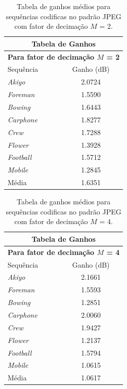 \begin{table}[hbt]
\centering
\caption{Tabela de ganhos médios para sequências codificas no padrão JPEG com fator de decimação $M$ = 2.}
\label{GanhoJpeg2}
\begin{tabular}{l|c}
\hline
\multicolumn{2}{c}{\textbf{Tabela de Ganhos}}\\
\hline
\hline
\multicolumn{2}{c}{\textbf{Para fator de decimação $M$ = 2}}\\
\hline
\hline			
Sequência	    & Ganho (dB)\\
\hline
\hline
\textit{Akiyo}		&2.0724\\
\hline
\textit{Foreman}		&1.5590\\
\hline
\textit{Bowing}		&1.6443\\
\hline
\textit{Carphone}		&1.8277\\
\hline
\textit{Crew}		&1.7288\\
\hline
\textit{Flower}		&1.3928\\
\hline
\textit{Football}		&1.5712\\
\hline
\textit{Mobile}	&1.2845\\
\hline
\hline
Média		&1.6351\\
\hline
\end{tabular}

\end{table}

\begin{table}[hbt]
\centering
\caption{Tabela de ganhos médios para sequências codificas no padrão JPEG com fator de decimação $M$ = 4.}	
\label{GanhoJpeg4}
\begin{tabular}{l|c}
\hline
\multicolumn{2}{c}{\textbf{Tabela de Ganhos}}\\
\hline
\hline
\multicolumn{2}{c}{\textbf{Para fator de decimação $M$ = 4}}\\
\hline
\hline			
Sequência	    & Ganho (dB)\\
\hline
\hline
\textit{Akiyo}		&2.1661\\
\hline
\textit{Foreman}		&1.5593 \\
\hline
\textit{Bowing}		&1.2851\\
\hline
\textit{Carphone}	& 2.0060\\
\hline
\textit{Crew}		& 1.9427\\
\hline
\textit{Flower}		&1.2137\\
\hline
\textit{Football}		&1.5794\\
\hline
\textit{Mobile}	&1.0615\\
\hline
\hline
Média	&1.0617\\
\hline
\end{tabular}
\end{table}
